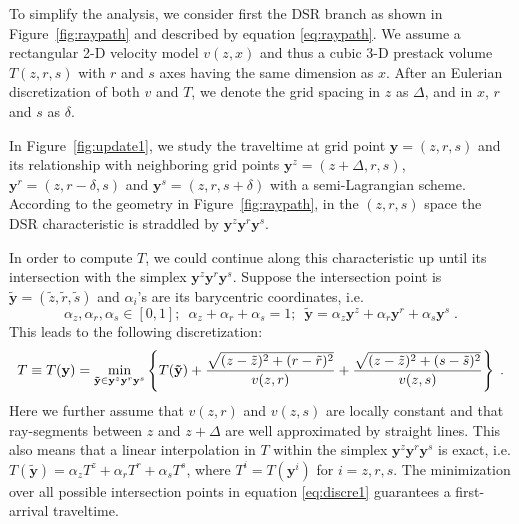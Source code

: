 To simplify the analysis, we consider first the DSR branch as shown in Figure~\ref{fig:raypath} and described by 
equation \ref{eq:raypath}. We assume a rectangular 2-D velocity model $v (z,x)$ and thus a cubic 3-D prestack 
volume $T (z,r,s)$ with $r$ and $s$ axes having the same dimension as $x$. After an Eulerian discretization of 
both $v$ and $T$, we denote the grid spacing in $z$ as $\Delta$, and in $x$, $r$ and $s$ as $\delta$. 

In Figure~\ref{fig:update1}, we study the traveltime at grid point $\mathbf{y} = (z,r,s)$ and its relationship 
with neighboring grid points $\mathbf{y}^z = (z+\Delta,r,s)$, $\mathbf{y}^r = (z,r-\delta,s)$ and 
$\mathbf{y}^s = (z,r,s+\delta)$ with a semi-Lagrangian scheme. According to the geometry in 
Figure~\ref{fig:raypath}, in the $(z,r,s)$ space the DSR characteristic \cite[]{duchkov} is straddled by 
$\mathbf{y}^z \mathbf{y}^r \mathbf{y}^s$. 

In order to compute $T$, we could continue along this characteristic up until its intersection with the simplex 
$\mathbf{y}^z \mathbf{y}^r \mathbf{y}^s$. Suppose the intersection point is 
$\mathbf{\tilde{y}} = (\tilde{z},\tilde{r},\tilde{s})$ and $\alpha_i$'s are its barycentric coordinates, i.e.
\begin{equation}
\label{eq:barycentric}
\alpha_z,\alpha_r,\alpha_s \in [0,1];\,\,\,
\alpha_z + \alpha_r + \alpha_s = 1;\,\,\,
\mathbf{\tilde{y}} = \alpha_z \mathbf{y}^z + \alpha_r \mathbf{y}^r + \alpha_s \mathbf{y}^s\;.
\end{equation}
This leads to the following discretization:
\begin{equation}
\label{eq:discre1}
T \equiv T (\mathbf{y}) = \smash{\displaystyle\min_{\mathbf{\tilde{y}} \in \mathbf{y}^z \mathbf{y}^r \mathbf{y}^s}} 
\left\{ T (\mathbf{\tilde{y}}) + \frac{\sqrt{(z-\tilde{z})^2 + (r-\tilde{r})^2}}{v (z,r)} 
+ \frac{\sqrt{(z-\tilde{z})^2 + (s-\tilde{s})^2}}{v (z,s)} \right\}\;.
\end{equation}
Here we further assume that $v (z,r)$ and $v (z,s)$ are locally constant and that ray-segments between $z$ and 
$z + \Delta$ are well approximated by straight lines. This also means that a linear interpolation in $T$ within 
the simplex $\mathbf{y}^z \mathbf{y}^r \mathbf{y}^s$ is exact, i.e. 
$T (\mathbf{\tilde{y}}) = \alpha_z T^z + \alpha_r T^r + \alpha_s T^s$, where $T^i = T (\mathbf{y}^i)$ for 
$i = z,r,s$. The minimization over all possible intersection points in equation \ref{eq:discre1} guarantees a 
first-arrival traveltime.

